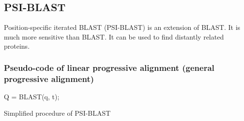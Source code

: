 %
%

%
%
\subsection{PSI-BLAST}
Position-specific iterated BLAST  (PSI-BLAST) is an extension of BLAST. It is much more sensitive than BLAST. It can be used to find distantly related proteins.

%
%
\subsubsection*{Pseudo-code of linear progressive alignment (general progressive alignment)}

\begin{algorithm}[H]
  
  \BlankLine
    
  
  \BlankLine \BlankLine
  
   Q = BLAST(q, t);

  \BlankLine \BlankLine


  \BlankLine   \BlankLine
  
  \caption{Simplified procedure of PSI-BLAST}

\end{algorithm}

\bigskip 

%
